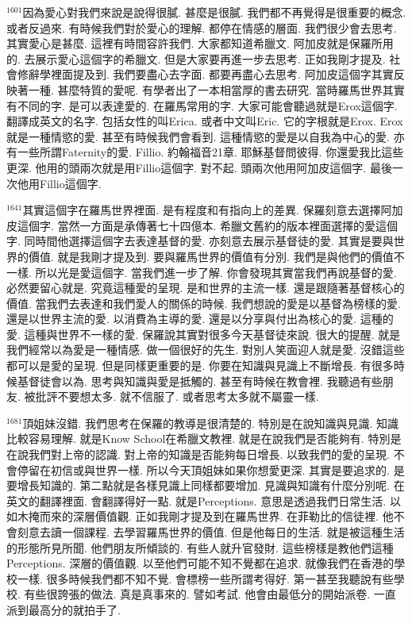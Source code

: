\documentclass{book}
\begin{document}
$^{1601}$因為愛心對我們來說是說得很膩.
甚麼是很膩.
我們都不再覺得是很重要的概念.
或者反過來.
有時候我們對於愛心的理解.
都停在情感的層面.
我們很少會去思考.
其實愛心是甚麼.
這裡有時間容許我們.
大家都知道希臘文.
阿加皮就是保羅所用的.
去展示愛心這個字的希臘文.
但是大家要再進一步去思考.
正如我剛才提及.
社會修辭學裡面提及到.
我們要盡心去字面.
都要再盡心去思考.
阿加皮這個字其實反映著一種.
甚麼特質的愛呢.
有學者出了一本相當厚的書去研究.
當時羅馬世界其實有不同的字.
是可以表達愛的.
在羅馬常用的字.
大家可能會聽過就是Erox這個字.
翻譯成英文的名字.
包括女性的叫Erica.
或者中文叫Eric.
它的字根就是Erox.
Erox就是一種情慾的愛.
甚至有時候我們會看到.
這種情慾的愛是以自我為中心的愛.
亦有一些所謂Faternity的愛.
Fillio.
約翰福音21章.
耶穌基督問彼得.
你還愛我比這些更深.
他用的頭兩次就是用Fillio這個字.
對不起.
頭兩次他用阿加皮這個字.
最後一次他用Fillio這個字.

$^{1641}$其實這個字在羅馬世界裡面.
是有程度和有指向上的差異.
保羅刻意去選擇阿加皮這個字.
當然一方面是承傳著七十四億本.
希臘文舊約的版本裡面選擇的愛這個字.
同時間他選擇這個字去表達基督的愛.
亦刻意去展示基督徒的愛.
其實是要與世界的價值.
就是我剛才提及到.
要與羅馬世界的價值有分別.
我們是與他們的價值不一樣.
所以光是愛這個字.
當我們進一步了解.
你會發現其實當我們再說基督的愛.
必然要留心就是.
究竟這種愛的呈現.
是和世界的主流一樣.
還是跟隨著基督核心的價值.
當我們去表達和我們愛人的關係的時候.
我們想說的愛是以基督為榜樣的愛.
還是以世界主流的愛.
以消費為主導的愛.
還是以分享與付出為核心的愛.
這種的愛.
這種與世界不一樣的愛.
保羅說其實對很多今天基督徒來說.
很大的提醒.
就是我們經常以為愛是一種情感.
做一個很好的先生.
對別人笑面迎人就是愛.
沒錯這些都可以是愛的呈現.
但是同樣更重要的是.
你要在知識與見識上不斷增長.
有很多時候基督徒會以為.
思考與知識與愛是抵觸的.
甚至有時候在教會裡.
我聽過有些朋友.
被批評不要想太多.
就不信服了.
或者思考太多就不屬靈一樣.

$^{1681}$頂姐妹沒錯.
我們思考在保羅的教導是很清楚的.
特別是在說知識與見識.
知識比較容易理解.
就是Know School在希臘文教裡.
就是在說我們是否能夠有.
特別是在說我們對上帝的認識.
對上帝的知識是否能夠每日增長.
以致我們的愛的呈現.
不會停留在初信或與世界一樣.
所以今天頂姐妹如果你想愛更深.
其實是要追求的.
是要增長知識的.
第二點就是各樣見識上同樣都要增加.
見識與知識有什麼分別呢.
在英文的翻譯裡面.
會翻譯得好一點.
就是Perceptions.
意思是透過我們日常生活.
以如木掩而來的深層價值觀.
正如我剛才提及到在羅馬世界.
在菲勒比的信徒裡.
他不會刻意去讀一個課程.
去學習羅馬世界的價值.
但是他每日的生活.
就是被這種生活的形態所見所聞.
他們朋友所傾談的.
有些人就升官發財.
這些榜樣是教他們這種Perceptions.
深層的價值觀.
以至他們可能不知不覺都在追求.
就像我們在香港的學校一樣.
很多時候我們都不知不覺.
會標榜一些所謂考得好.
第一甚至我聽說有些學校.
有些很誇張的做法.
真是真事來的.
譬如考試.
他會由最低分的開始派卷.
一直派到最高分的就拍手了.
\end{document}
